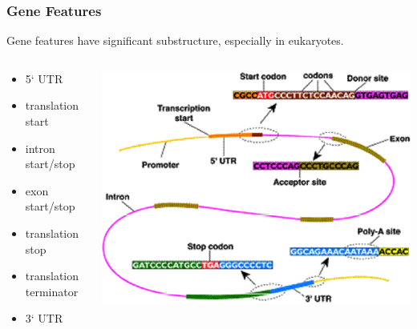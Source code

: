 \begin{frame}
  \frametitle{Gene Features}
  Gene features have significant substructure, especially in eukaryotes.
  \begin{columns}[T]
    \begin{column}{4cm}
      \begin{itemize}
      \item 5` UTR
        \item translation start
        \item intron start/stop
        \item exon start/stop
        \item translation stop
        \item translation terminator
        \item 3` UTR
      \end{itemize}
    \end{column}
    \begin{column}{6cm}
      \includegraphics[width=1\textwidth]{images/eukaryotic_gene}
    \end{column}
  \end{columns}       
\end{frame}

